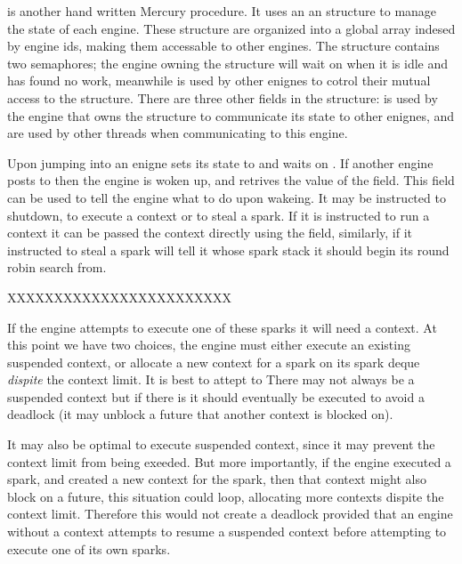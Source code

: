 \sleep is another hand written Mercury procedure.
It uses an an
 structure to manage the state of each engine.
These structure are organized into a global array indesed by engine ids,
making them accessable to other engines.
The structure contains two semaphores;
the engine owning the structure will wait on  when it is
idle and has found no work,
meanwhile  is used by other enignes to cotrol their mutual
access to the \enginesleepsync structure.
There are three other fields in the structure:
 is used by the engine that owns the structure to communicate
its state to other enignes,
 and  are used by other threads when
communicating to this engine.

Upon jumping into \idle an enigne sets its state to  and
waits on .
If another engine posts to  then the engine is woken up,
and retrives the value of the  field.
This field can be used to tell the engine what to do upon wakeing.
It may be instructed to shutdown, to execute a context or to steal a spark.
If it is instructed to run a context it can be passed the context directly
using the  field,
similarly, if it instructed to steal a spark  will tell
it whose spark stack it should begin its round robin search from.



XXXXXXXXXXXXXXXXXXXXXXXX

If the engine attempts to execute one of these sparks it will need a
context.
At this point we have two choices,
the engine must either execute an existing suspended context,
or allocate a new context for a spark on its spark deque \emph{dispite} the
context limit.
It is best to attept to 
There may not always be a suspended context but if there is it should
eventually be executed to avoid a deadlock
(it may unblock a future that another context is blocked on).

It may also be optimal to execute suspended context,
since it may prevent the context limit from being exeeded.
But more importantly,
if the engine executed a spark,
and created a new context for the spark,
then that context might also block on a future,
this situation could loop, allocating more contexts dispite the context
limit.
Therefore this would not create a deadlock provided that an engine without a
context attempts to resume a suspended context before attempting to execute
one of its own sparks.

